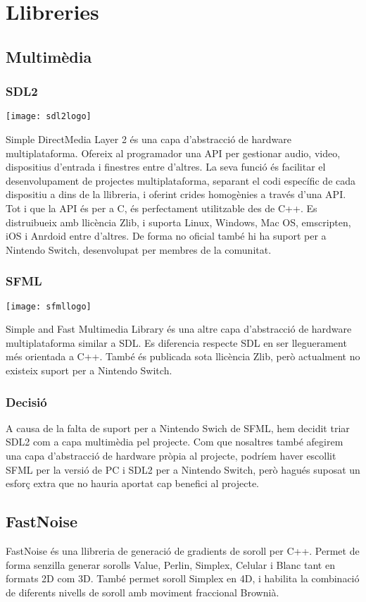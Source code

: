 \section{Llibreries}
\subsection{Multimèdia}
\subsubsection{SDL2}
\begin{center}
  \texttt{[image: sdl2logo]}
\end{center}
Simple DirectMedia Layer 2 és una capa d'abstracció de hardware multiplataforma. Ofereix al programador una API per gestionar audio, video, dispositius d'entrada i finestres entre d'altres. La seva funció és facilitar el desenvolupament de projectes multiplataforma, separant el codi específic de cada dispositiu a dins de la llibreria, i oferint crides homogènies a través d'una API.
Tot i que la API és per a C, és perfectament utilitzable des de C++. Es distruibueix amb llicència Zlib, i suporta Linux, Windows, Mac OS, emscripten, iOS i Anrdoid entre d'altres. De forma no oficial també hi ha suport per a Nintendo Switch, desenvolupat per membres de la comunitat.
\subsubsection{SFML}
\begin{center}
  \texttt{[image: sfmllogo]}
\end{center}
Simple and Fast Multimedia Library és una altre capa d'abstracció de hardware multiplataforma similar a SDL. Es diferencia respecte SDL en ser lleguerament més orientada a C++. També és publicada sota llicència Zlib, però actualment no existeix suport per a Nintendo Switch.
\subsubsection{Decisió}
A causa de la falta de suport per a Nintendo Swich de SFML, hem decidit triar SDL2 com a capa multimèdia pel projecte. Com que nosaltres també afegirem una capa d'abstracció de hardware pròpia al projecte, podríem haver escollit SFML per la versió de PC i SDL2 per a Nintendo Switch, però hagués suposat un esforç extra que no hauria aportat cap benefici al projecte.

\subsection{FastNoise}
FastNoise és una llibreria de generació de gradients de soroll per C++. Permet de forma senzilla generar sorolls Value, Perlin, Simplex, Celular i Blanc tant en formats 2D com 3D. També permet soroll Simplex en 4D, i habilita la combinació de diferents nivells de soroll amb moviment fraccional Brownià.
